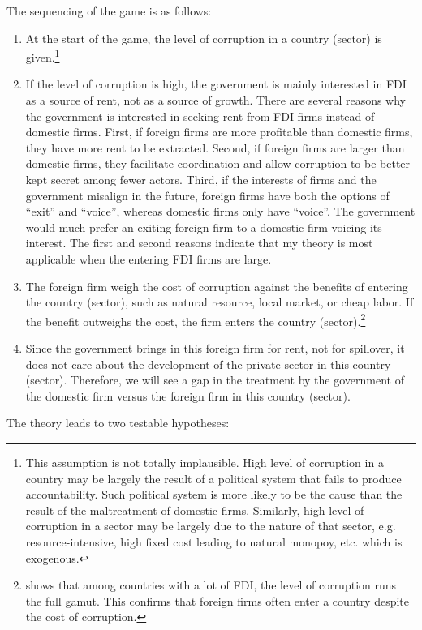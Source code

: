 The sequencing of the game is as follows:
\begin{enumerate}
\item At the start of the game, the level of corruption in a country (sector) is given.\footnote{This assumption is not totally implausible. High level of corruption in a country may be largely the result of a political system that fails to produce accountability. Such political system is more likely to be the cause than the result of the maltreatment of domestic firms. Similarly, high level of corruption in a sector may be largely due to the nature of that sector, e.g. resource-intensive, high fixed cost leading to natural monopoy, etc. which is exogenous.}
\item  If the level of corruption is high, the government is mainly interested in FDI as a source of rent, not as a source of growth. There are several reasons why the government is interested in seeking rent from FDI firms instead of domestic firms. First, if foreign firms are more profitable than domestic firms, they have more rent to be extracted. Second, if foreign firms are larger than domestic firms, they facilitate coordination and allow corruption to be better kept secret among fewer actors. Third, if the interests of firms and the government misalign in the future, foreign firms have both the options of ``exit'' and ``voice'', whereas domestic firms only have ``voice''. The government would much prefer an exiting foreign firm to a domestic firm voicing its interest. The first and second reasons indicate that my theory is most applicable when the entering FDI firms are large.
\item The foreign firm weigh the cost of corruption against the benefits of entering the country (sector), such as natural resource, local market, or cheap labor. If the benefit outweighs the cost, the firm enters the country (sector).\footnote{ shows that among countries with a lot of FDI, the level of corruption runs the full gamut. This confirms that foreign firms often enter a country despite the cost of corruption.}
\item Since the government brings in this foreign firm for rent, not for spillover, it does not care about the development of the private sector in this country (sector). Therefore, we will see a gap in the treatment by the government of the domestic firm versus the foreign firm in this country (sector).
\end{enumerate}

The theory leads to two testable hypotheses:

